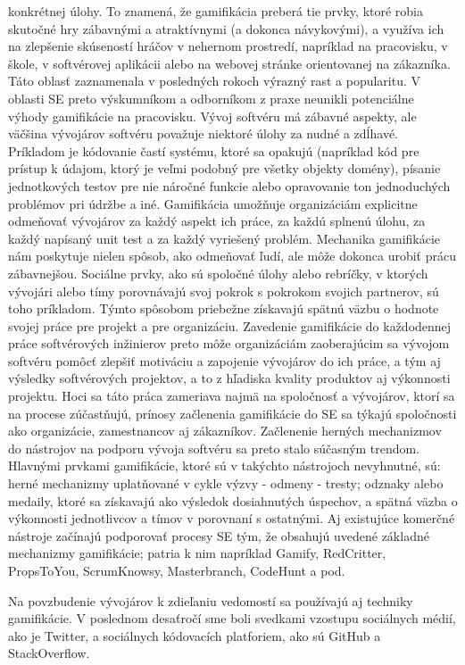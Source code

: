 \documentclass[14pt,a4paper]{article}
\begin{document}
konkrétnej úlohy. To znamená, že gamifikácia preberá tie prvky, 
ktoré robia skutočné hry zábavnými a atraktívnymi (a dokonca návykovými), 
a využíva ich na zlepšenie skúseností hráčov v nehernom prostredí, 
napríklad na pracovisku, v škole, v softvérovej aplikácii alebo na 
webovej stránke orientovanej na zákazníka. 
Táto oblasť zaznamenala v posledných rokoch výrazný rast a popularitu.
V oblasti SE preto výskumníkom a odborníkom z praxe neunikli potenciálne 
výhody gamifikácie na pracovisku. 
Vývoj softvéru má zábavné aspekty, 
ale väčšina vývojárov softvéru považuje niektoré úlohy za nudné a zdĺhavé. 
Príkladom je kódovanie častí systému, ktoré sa opakujú
(napríklad kód pre prístup k údajom, 
ktorý je veľmi podobný pre všetky objekty domény), 
písanie jednotkových testov pre nie náročné funkcie alebo opravovanie ton 
jednoduchých problémov pri údržbe a iné. 
Gamifikácia umožňuje organizáciám explicitne odmeňovať vývojárov za 
každý aspekt ich práce, za každú splnenú úlohu, 
za každý napísaný unit test a za každý vyriešený problém. 
Mechanika gamifikácie nám poskytuje nielen spôsob, ako odmeňovať ľudí, 
ale môže dokonca urobiť prácu zábavnejšou. 
Sociálne prvky, ako sú spoločné úlohy alebo rebríčky, 
v ktorých vývojári alebo tímy porovnávajú svoj pokrok s pokrokom svojich 
partnerov, sú toho príkladom. Týmto spôsobom priebežne získavajú spätnú 
väzbu o hodnote svojej práce pre projekt a pre organizáciu. 
Zavedenie gamifikácie do každodennej práce softvérových inžinierov 
preto môže organizáciám zaoberajúcim sa vývojom softvéru pomôcť 
zlepšiť motiváciu a zapojenie vývojárov do ich práce, 
a tým aj výsledky softvérových projektov, a to z hľadiska kvality 
produktov aj výkonnosti projektu. 
Hoci sa táto práca zameriava najmä na spoločnosť a vývojárov, 
ktorí sa na procese zúčastňujú, prínosy začlenenia gamifikácie do 
SE sa týkajú spoločnosti ako organizácie, zamestnancov aj zákazníkov.
Začlenenie herných mechanizmov do nástrojov na podporu vývoja softvéru 
sa preto stalo súčasným trendom. 
Hlavnými prvkami gamifikácie, ktoré sú v takýchto nástrojoch nevyhnutné, 
sú: herné mechanizmy uplatňované v cykle výzvy - odmeny - tresty; 
odznaky alebo medaily, ktoré sa získavajú ako výsledok dosiahnutých 
úspechov, a spätná väzba o výkonnosti jednotlivcov a tímov 
v porovnaní s ostatnými. 
Aj existujúce komerčné nástroje začínajú podporovať procesy SE tým, 
že obsahujú uvedené základné mechanizmy gamifikácie; 
patria k nim napríklad Gamify, RedCritter, PropsToYou, 
ScrumKnowsy, Masterbranch, CodeHunt a pod\cite{201721}.

Na povzbudenie vývojárov k zdieľaniu vedomostí sa používajú aj 
techniky gamifikácie. 
V poslednom desaťročí sme boli svedkami vzostupu sociálnych médií, 
ako je Twitter, a sociálnych kódovacích platforiem, 
ako sú GitHub a StackOverflow\cite{8717887}.
\end{document}
